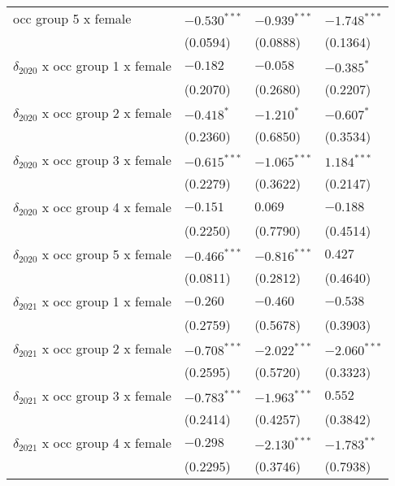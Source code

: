 \begin{tabular}{llll}
occ group 5 x female                   &  $-0.530^{***}$ &  $-0.939^{***}$ &  $-1.748^{***}$ \\
                                       &        (0.0594) &        (0.0888) &        (0.1364) \\
$\delta_{2020}$ x occ group 1 x female &        $-0.182$ &        $-0.058$ &      $-0.385^*$ \\
                                       &        (0.2070) &        (0.2680) &        (0.2207) \\
$\delta_{2020}$ x occ group 2 x female &      $-0.418^*$ &      $-1.210^*$ &      $-0.607^*$ \\
                                       &        (0.2360) &        (0.6850) &        (0.3534) \\
$\delta_{2020}$ x occ group 3 x female &  $-0.615^{***}$ &  $-1.065^{***}$ &   $1.184^{***}$ \\
                                       &        (0.2279) &        (0.3622) &        (0.2147) \\
$\delta_{2020}$ x occ group 4 x female &        $-0.151$ &         $0.069$ &        $-0.188$ \\
                                       &        (0.2250) &        (0.7790) &        (0.4514) \\
$\delta_{2020}$ x occ group 5 x female &  $-0.466^{***}$ &  $-0.816^{***}$ &         $0.427$ \\
                                       &        (0.0811) &        (0.2812) &        (0.4640) \\
$\delta_{2021}$ x occ group 1 x female &        $-0.260$ &        $-0.460$ &        $-0.538$ \\
                                       &        (0.2759) &        (0.5678) &        (0.3903) \\
$\delta_{2021}$ x occ group 2 x female &  $-0.708^{***}$ &  $-2.022^{***}$ &  $-2.060^{***}$ \\
                                       &        (0.2595) &        (0.5720) &        (0.3323) \\
$\delta_{2021}$ x occ group 3 x female &  $-0.783^{***}$ &  $-1.963^{***}$ &         $0.552$ \\
                                       &        (0.2414) &        (0.4257) &        (0.3842) \\
$\delta_{2021}$ x occ group 4 x female &        $-0.298$ &  $-2.130^{***}$ &   $-1.783^{**}$ \\
                                       &        (0.2295) &        (0.3746) &        (0.7938) \\

\end{tabular}
